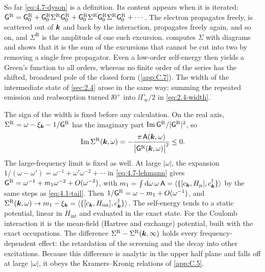 So far \cref{eq:4.7-dyson} is a definition. Its content appears when it is iterated: $\mathsf{G}^{\mathrm{R}} = \mathsf{G}^{\mathrm{R}}_0 + \mathsf{G}^{\mathrm{R}}_0\Sigma^{\mathrm{R}}\mathsf{G}^{\mathrm{R}}_0 + \mathsf{G}^{\mathrm{R}}_0\Sigma^{\mathrm{R}}\mathsf{G}^{\mathrm{R}}_0\Sigma^{\mathrm{R}}\mathsf{G}^{\mathrm{R}}_0 + \cdots$. The electron propagates freely, is scattered out of $\bm{k}$ and back by the interaction, propagates freely again, and so on, and $\Sigma^{\mathrm{R}}$ is the amplitude of one such excursion.  computes $\Sigma$ with diagrams and shows that it is the sum of the excursions that cannot be cut into two by removing a single free propagator. Even a low-order self-energy then yields a Green's function to all orders, whereas no finite order of the series has the shifted, broadened pole of the closed form (\cref{app:C.7}). The width of the intermediate state of \cref{sec:2.4} arose in the same way: summing the repeated emission and reabsorption turned $\ii0^+$ into $\ii\varGamma_{\mathrm{w}}/2$ in \cref{eq:2.4-width}.

The sign of the width is fixed before any calculation. On the real axis, $\Sigma^{\mathrm{R}} = \omega - \xi_{\bm{k}} - 1/\mathsf{G}^{\mathrm{R}}$ has the imaginary part $\operatorname{Im}\mathsf{G}^{\mathrm{R}}/|\mathsf{G}^{\mathrm{R}}|^2$, so
\begin{equation}
  \operatorname{Im}\Sigma^{\mathrm{R}}(\bm{k},\omega) = -\frac{\pi\,\mathsf{A}(\bm{k},\omega)}{\bigl|\mathsf{G}^{\mathrm{R}}(\bm{k},\omega)\bigr|^2} \le 0 .
  \label{eq:4.7-ImSigma}
\end{equation}
The large-frequency limit is fixed as well. At large $|\omega|$, the expansion $1/(\omega - \omega') = \omega^{-1} + \omega'\omega^{-2} + \cdots$ in \cref{eq:4.7-lehmann} gives $\mathsf{G}^{\mathrm{R}} = \omega^{-1} + m_1\omega^{-2} + O(\omega^{-3})$, with $m_1 = \int\mathrm{d}\omega\,\omega\,\mathsf{A} = \langle\{[c_{\bm{k}}, H_\mu], c^\dagger_{\bm{k}}\}\rangle$ by the same steps as \cref{eq:4.1-tail}. Then $1/\mathsf{G}^{\mathrm{R}} = \omega - m_1 + O(\omega^{-1})$, and $\Sigma^{\mathrm{R}}(\bm{k},\omega) \to m_1 - \xi_{\bm{k}} = \langle\{[c_{\bm{k}}, H_{\mathrm{int}}], c^\dagger_{\bm{k}}\}\rangle$. The self-energy tends to a static potential, linear in $H_{\mathrm{int}}$ and evaluated in the exact state. For the Coulomb interaction it is the mean-field (Hartree and exchange) potential, built with the exact occupations. The difference $\Sigma^{\mathrm{R}} - \Sigma^{\mathrm{R}}(\bm{k},\infty)$ holds every frequency-dependent effect: the retardation of the screening and the decay into other excitations. Because this difference is analytic in the upper half plane and falls off at large $|\omega|$, it obeys the Kramers--Kronig relations of \cref{app:C.5}.

